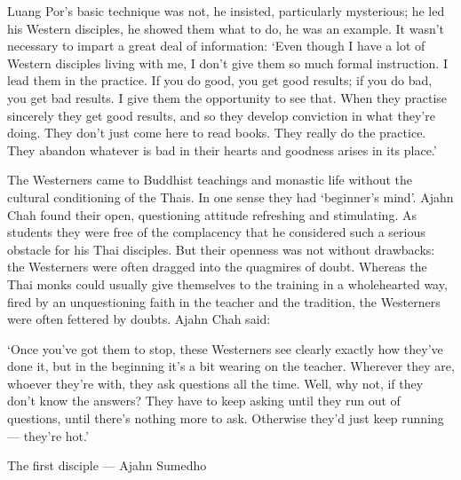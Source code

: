 Luang Por's basic technique was not, he insisted, particularly
mysterious; he led his Western disciples, he showed them what to do, he
was an example. It wasn't necessary to impart a great deal of
information: `Even though I have a lot of Western disciples living with
me, I don't give them so much formal instruction. I lead them in the
practice. If you do good, you get good results; if you do bad, you get
bad results. I give them the opportunity to see that. When they practise
sincerely they get good results, and so they develop conviction in what
they're doing. They don't just come here to read books. They really do
the practice. They abandon whatever is bad in their hearts and goodness
arises in its place.'

The Westerners came to Buddhist teachings and monastic life without the
cultural conditioning of the Thais. In one sense they had `beginner's
mind'. Ajahn Chah found their open, questioning attitude refreshing and
stimulating. As students they were free of the complacency that he
considered such a serious obstacle for his Thai disciples. But their
openness was not without drawbacks: the Westerners were often dragged
into the quagmires of doubt. Whereas the Thai monks could usually give
themselves to the training in a wholehearted way, fired by an
unquestioning faith in the teacher and the tradition, the Westerners
were often fettered by doubts. Ajahn Chah said:

`Once you've got them to stop, these Westerners see clearly exactly how
they've done it, but in the beginning it's a bit wearing on the teacher.
Wherever they are, whoever they're with, they ask questions all the
time. Well, why not, if they don't know the answers? They have to keep
asking until they run out of questions, until there's nothing more to
ask. Otherwise they'd just keep running --- they're hot.'

The first disciple --- Ajahn Sumedho

